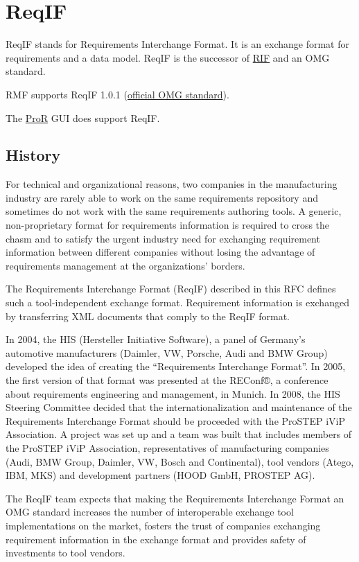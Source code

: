\section{ReqIF}

ReqIF stands for Requirements Interchange Format. It is an exchange
format for requirements and a data model. ReqIF is the successor of
\href{RMF/RIF}{RIF} and an OMG standard.

RMF supports ReqIF 1.0.1 (\href{http://www.omg.org/spec/ReqIF/}{official
OMG standard}).

The \href{RMF/ProR}{ProR} GUI does support ReqIF.

\subsection{History}

For technical and organizational reasons, two companies in the
manufacturing industry are rarely able to work on the same requirements
repository and sometimes do not work with the same requirements
authoring tools. A generic, non-proprietary format for requirements
information is required to cross the chasm and to satisfy the urgent
industry need for exchanging requirement information between different
companies without losing the advantage of requirements management at the
organizations' borders.

The Requirements Interchange Format (ReqIF) described in this RFC
defines such a tool-independent exchange format. Requirement information
is exchanged by transferring XML documents that comply to the ReqIF
format.

In 2004, the HIS (Hersteller Initiative Software), a panel of Germany's
automotive manufacturers (Daimler, VW, Porsche, Audi and BMW Group)
developed the idea of creating the ``Requirements Interchange Format''.
In 2005, the first version of that format was presented at the REConf®,
a conference about requirements engineering and management, in Munich.
In 2008, the HIS Steering Committee decided that the
internationalization and maintenance of the Requirements Interchange
Format should be proceeded with the ProSTEP iViP Association. A project
was set up and a team was built that includes members of the ProSTEP
iViP Association, representatives of manufacturing companies (Audi, BMW
Group, Daimler, VW, Bosch and Continental), tool vendors (Atego, IBM,
MKS) and development partners (HOOD GmbH, PROSTEP AG).

The ReqIF team expects that making the Requirements Interchange Format
an OMG standard increases the number of interoperable exchange tool
implementations on the market, fosters the trust of companies exchanging
requirement information in the exchange format and provides safety of
investments to tool vendors.

